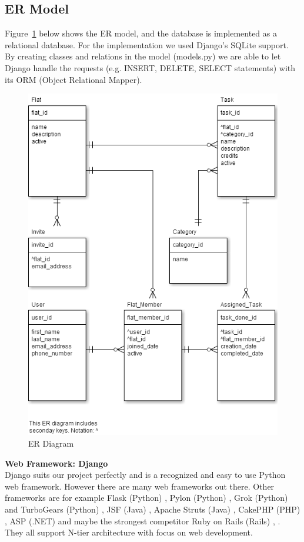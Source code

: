 \documentclass{sig-alt-release2}
\begin{document}
\subsection{ER Model}
Figure~\ref{fig:er} below shows the ER model, and the database is implemented
as a relational database. For the implementation we used Django's SQLite
support. By creating classes and relations in the model (models.py) we are able
to let Django handle the requests (e.g. INSERT, DELETE, SELECT statements) with
its ORM (Object Relational Mapper).

\begin{figure}[!ht]
\centering
\includegraphics[scale=0.3]{er}
\caption{ ER Diagram}
\label{fig:er}
\end{figure}

\noindent \textbf{Web Framework: Django} \\ 
Django suits our project perfectly and is a recognized and easy to use Python
web framework. However there are many web frameworks out there. Other frameworks
are for example Flask (Python) \cite{x1}, Pylon (Python) \cite{x2}, Grok
(Python) \cite{x3} and TurboGears (Python) \cite{x4}, JSF (Java) \cite{x5},
Apache Struts (Java) \cite{x6}, CakePHP (PHP) \cite{x7}, ASP (.NET) \cite{x8}
and maybe the strongest competitor Ruby on Rails (Rails) \cite{x9}, \cite{x19}.
They all support N-tier architecture with focus on web development.
\end{document}
